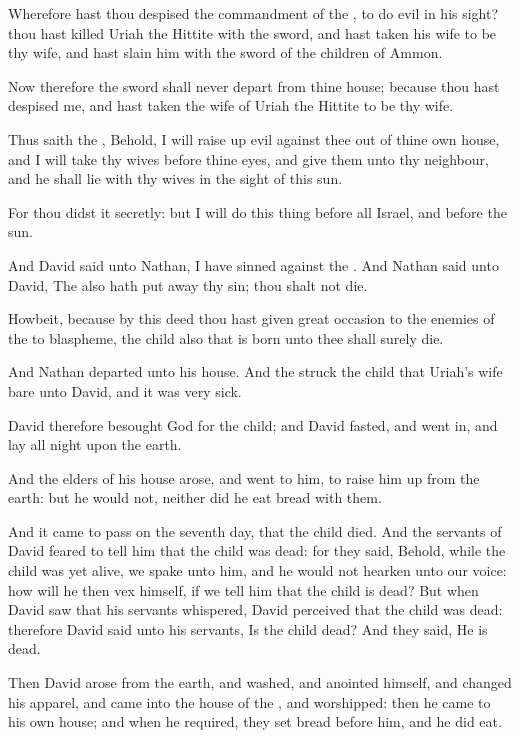 \Verse Wherefore hast thou despised the commandment of the \LORD, to do evil in his sight? thou hast killed Uriah the Hittite with the sword, and hast taken his wife to be thy wife, and hast slain him with the sword of the children of Ammon.

\Verse Now therefore the sword shall never depart from thine house; because thou hast despised me, and hast taken the wife of Uriah the Hittite to be thy wife.

\Verse Thus saith the \LORD, Behold, I will raise up evil against thee out of thine own house, and I will take thy wives before thine eyes, and give them unto thy neighbour, and he shall lie with thy wives in the sight of this sun.

\Verse For thou didst it secretly: but I will do this thing before all Israel, and before the sun.

\Verse And David said unto Nathan, I have sinned against the \LORD. And Nathan said unto David, The \LORD also hath put away thy sin; thou shalt not die.

\Verse Howbeit, because by this deed thou hast given great occasion to the enemies of the \LORD to blaspheme, the child also that is born unto thee shall surely die.

\Verse And Nathan departed unto his house. And the \LORD struck the child that Uriah's wife bare unto David, and it was very sick.

\Verse David therefore besought God for the child; and David fasted, and went in, and lay all night upon the earth.

\Verse And the elders of his house arose, and went to him, to raise him up from the earth: but he would not, neither did he eat bread with them.

\Verse And it came to pass on the seventh day, that the child died. And the servants of David feared to tell him that the child was dead: for they said, Behold, while the child was yet alive, we spake unto him, and he would not hearken unto our voice: how will he then vex himself, if we tell him that the child is dead?  \Verse But when David saw that his servants whispered, David perceived that the child was dead: therefore David said unto his servants, Is the child dead? And they said, He is dead.

\Verse Then David arose from the earth, and washed, and anointed himself, and changed his apparel, and came into the house of the \LORD, and worshipped: then he came to his own house; and when he required, they set bread before him, and he did eat.

